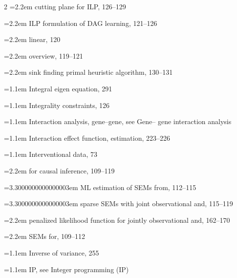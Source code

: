 \begin{multicols}{2}
\noindent\hangindent=2.2em \hspace*{1.1em}cutting plane for ILP, 126--129\par
\noindent\hangindent=2.2em \hspace*{1.1em}ILP formulation of DAG learning, 121--126\par
\noindent\hangindent=2.2em \hspace*{1.1em}linear, 120\par
\noindent\hangindent=2.2em \hspace*{1.1em}overview, 119--121\par
\noindent\hangindent=2.2em \hspace*{1.1em}sink finding primal heuristic algorithm, 130--131\par
\noindent\hangindent=1.1em Integral eigen equation, 291\par
\noindent\hangindent=1.1em Integrality constraints, 126\par
\noindent\hangindent=1.1em Interaction analysis, gene--gene, see Gene-- gene interaction analysis\par
\noindent\hangindent=1.1em Interaction effect function, estimation, 223--226\par
\noindent\hangindent=1.1em Interventional data, 73\par
\noindent\hangindent=2.2em \hspace*{1.1em}for causal inference, 109--119\par
\noindent\hangindent=3.3000000000000003em \hspace*{2.2em}ML estimation of SEMs from, 112--115\par
\noindent\hangindent=3.3000000000000003em \hspace*{2.2em}sparse SEMs with joint observational and, 115--119\par
\noindent\hangindent=2.2em \hspace*{1.1em}penalized likelihood function for jointly observational and, 162--170\par
\noindent\hangindent=2.2em \hspace*{1.1em}SEMs for, 109--112\par
\noindent\hangindent=1.1em Inverse of variance, 255\par
\noindent\hangindent=1.1em IP, see Integer programming (IP)\par

\end{multicols}
